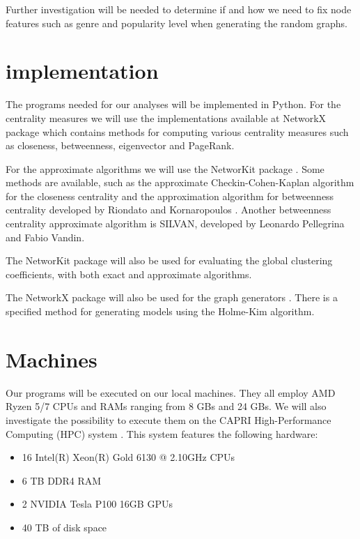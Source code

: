 \documentclass[a4paper, 12pt, conference]{ieeeconf}      %
\begin{document}
Further investigation will be needed to determine if and how we need to fix node features such as genre and popularity level when generating the random graphs.



\section{implementation}
The programs needed for our analyses will be implemented in Python. For the centrality measures we will use the implementations available at NetworkX package \cite{NetworkX_Centrality} which contains methods for computing various centrality measures such as closeness, betweenness, eigenvector and PageRank. 


For the approximate algorithms we will use the NetworKit package \cite{NetworKit_centrality}. Some methods are available, such as the approximate Checkin-Cohen-Kaplan algorithm for the closeness centrality \cite{Chechik2015} and the approximation algorithm for betweenness centrality developed by Riondato and Kornaropoulos \cite{Riondato2016}.
Another betweenness centrality approximate algorithm is SILVAN, developed by Leonardo Pellegrina and Fabio Vandin. \cite{SILVAN}

The NetworKit package will also be used for evaluating the global clustering coefficients, with both exact and approximate algorithms. \cite{NetworKit_globals_clustering}


The NetworkX package will also be used for the graph generators \cite{NetworkX_Graph}. There is a specified method for generating models using the Holme-Kim algorithm.

\section{Machines}

Our programs will be executed on our local machines. They all employ AMD Ryzen 5/7 CPUs and RAMs ranging from 8 GBs and 24 GBs. We will also investigate the possibility to execute them on the CAPRI High-Performance Computing (HPC) system \cite{capri}. This system features the following hardware:
\begin{itemize}
    \item 16 Intel(R) Xeon(R) Gold 6130 @ 2.10GHz CPUs
    \item 6 TB DDR4 RAM
    \item 2 NVIDIA Tesla P100 16GB GPUs
    \item 40 TB of disk space
\end{itemize}
\end{document}
